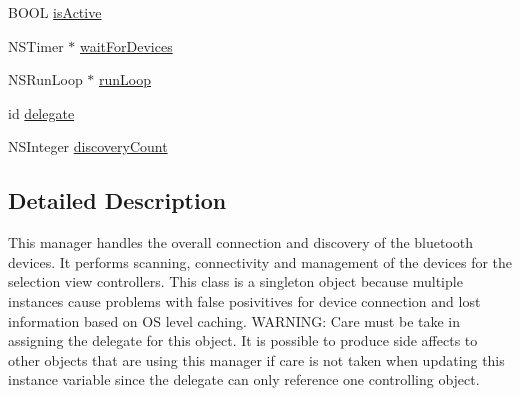 \begin{DoxyCompactItemize}
B\-O\-O\-L \hyperlink{interface_b_t_device_manager_a0864f241d9fc14f03e5f8e2b4dd0667a}{is\-Active}
\item 
N\-S\-Timer $\ast$ \hyperlink{interface_b_t_device_manager_aad4f780b6477ad7d37f6e85f3f40f1c0}{wait\-For\-Devices}
\item 
N\-S\-Run\-Loop $\ast$ \hyperlink{interface_b_t_device_manager_a2f3ce5cb472e8f042d4b427518d0ffea}{run\-Loop}
\item 
id \hyperlink{interface_b_t_device_manager_a53dc4023fb9a5873cd8f7a82489d25c0}{delegate}
\item 
N\-S\-Integer \hyperlink{interface_b_t_device_manager_ac70dac2c693cf191a05a606d7cea9763}{discovery\-Count}
\end{DoxyCompactItemize}


\subsection{Detailed Description}
This manager handles the overall connection and discovery of the bluetooth devices. It performs scanning, connectivity and management of the devices for the selection view controllers. This class is a singleton object because multiple instances cause problems with false posivitives for device connection and lost information based on O\-S level caching. W\-A\-R\-N\-I\-N\-G\-: Care must be take in assigning the delegate for this object. It is possible to produce side affects to other objects that are using this manager if care is not taken when updating this instance variable since the delegate can only reference one controlling object. 

